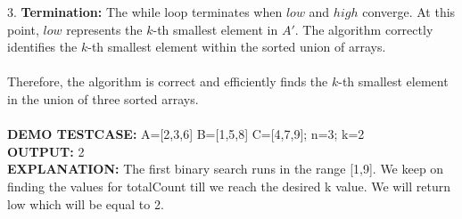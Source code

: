 \documentclass{article}
\begin{document}
3. \textbf{Termination:}
   The while loop terminates when $low$ and $high$ converge. At this point, $low$ represents the $k$-th smallest element in $A'$. The algorithm correctly identifies the $k$-th smallest element within the sorted union of arrays.
\\\\
Therefore, the algorithm is correct and efficiently finds the $k$-th smallest element in the union of three sorted arrays.
\\\\
\textbf{DEMO TESTCASE:} A=[2,3,6] B=[1,5,8] C=[4,7,9]; n=3; k=2
\\
\textbf{OUTPUT:} 2
\\
\textbf{EXPLANATION:} The first binary search runs in the range [1,9]. We keep on finding the values for totalCount till we reach the desired k value. We will return low which will be equal to 2.
\end{document}
